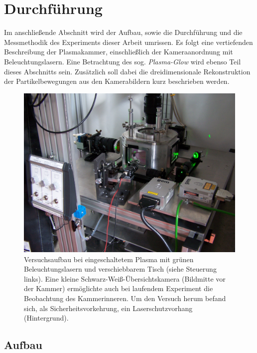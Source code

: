 \documentclass[numbers=noenddot,a4paper,notitlepage,twoside,BCOR15mm]{scrbook}
\newcommand{\tilt}[1]{\textit{#1}}
\begin{document}
	\chapter{Durchführung}\label{sec:durch}

		Im anschlie{\ss}ende Abschnitt wird der Aufbau, sowie die Durchf\"uhrung und die Messmethodik des Experiments dieser Arbeit umrissen. Es folgt eine vertiefenden Beschreibung der Plasmakammer, einschlie{\ss}lich der Kameraanordnung mit Beleuchtungslasern. Eine Betrachtung des sog. \tilt{Plasma-Glow} wird ebenso Teil dieses Abschnitts sein. Zus\"atzlich soll dabei die dreidimensionale Rekonstruktion der Partikelbewegungen aus den Kamerabildern kurz beschrieben werden.

			\begin{figure}[H]
				\centering
				\includegraphics[width=\textwidth,height=0.7\textwidth]{figs/cam/aufbau.jpg}
				\caption{Versuchsaufbau bei eingeschaltetem Plasma mit grünen Beleuchtungslasern und verschiebbarem Tisch (siehe Steuerung links). Eine kleine Schwarz-Weiß-Übersichtskamera (Bildmitte vor der Kammer) ermöglichte auch bei laufendem Experiment die Beobachtung des Kammerinneren. Um den Versuch herum befand sich, als Sicherheitsvorkehrung, ein Laserschutzvorhang (Hintergrund).}
				\label{img:photo}
			\end{figure}

		\section{Aufbau}
\end{document}
